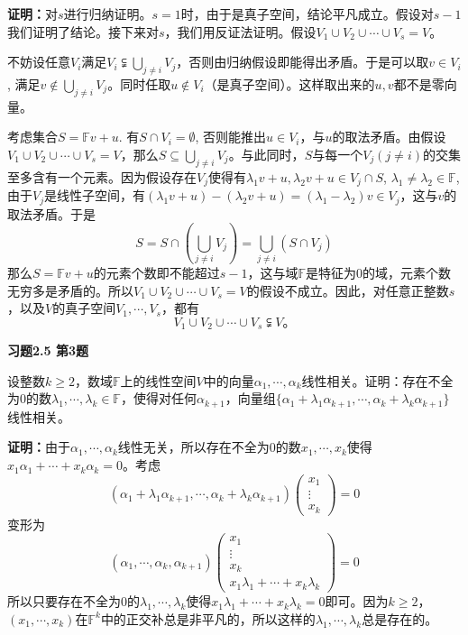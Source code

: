 {\bf 证明：}对$s$进行归纳证明。$s=1$时，由于是真子空间，结论平凡成立。假设对$s-1$我们证明了结论。接下来对$s$，我们用反证法证明。假设$V_1\cup V_2\cup \cdots \cup V_s = V$。

不妨设任意$V_i$满足$V_i \subsetneqq \bigcup\limits_{j\neq i} V_j$，否则由归纳假设即能得出矛盾。于是可以取$v\in V_i$, 满足$v\not\in \bigcup\limits_{j\neq i} V_j$。同时任取$u\not\in V_i$（是真子空间）。这样取出来的$u,v$都不是零向量。

考虑集合$S = \mathbb{F}v + u$. 有$S\cap V_i=\emptyset$, 否则能推出$u\in V_i$，与$u$的取法矛盾。由假设$V_1\cup V_2\cup \cdots \cup V_s = V$，那么$S\subseteq \bigcup\limits_{j\neq i} V_j$。与此同时，$S$与每一个$V_j (j\neq i)$的交集至多含有一个元素。因为假设存在$V_j$使得有$\lambda_1v+u, \lambda_2v+u \in V_j\cap S$, $\lambda_1\neq\lambda_2 \in \mathbb{F}$, 由于$V_j$是线性子空间，有$(\lambda_1v+u) - (\lambda_2v+u) = (\lambda_1 - \lambda_2)v \in V_j$，这与$v$的取法矛盾。于是
$$S = S\cap (\bigcup\limits_{j\neq i} V_j) = \bigcup\limits_{j\neq i} (S \cap V_j)$$
那么$S = \mathbb{F}v + u$的元素个数即不能超过$s-1$，这与域$\mathbb{F}$是特征为0的域，元素个数无穷多是矛盾的。所以$V_1\cup V_2\cup \cdots \cup V_s = V$的假设不成立。因此，对任意正整数$s$，以及$V$的真子空间$V_1,\cdots,V_s$，都有
$$V_1\cup V_2\cup \cdots \cup V_s \subsetneqq V。$$

\newpageorvspace

{\bf 习题2.5 第3题}

设整数$k\geqslant 2$，数域$\mathbb{F}$上的线性空间$V$中的向量$\alpha_1,\cdots, \alpha_k$线性相关。证明：存在不全为0的数$\lambda_1,\cdots,\lambda_k\in \mathbb{F}$，使得对任何$\alpha_{k+1}$，向量组$\{\alpha_1+\lambda_1\alpha_{k+1}, \cdots, \alpha_k+\lambda_k\alpha_{k+1}\}$线性相关。

{\bf 证明：}由于$\alpha_1,\cdots, \alpha_k$线性无关，所以存在不全为0的数$x_1,\cdots,x_k$使得$x_1\alpha_1+\cdots+x_k\alpha_k = 0$。考虑
$$(\alpha_1+\lambda_1\alpha_{k+1}, \cdots, \alpha_k+\lambda_k\alpha_{k+1}) \begin{pmatrix} x_1 \\ \vdots \\ x_k \end{pmatrix} = 0$$
变形为
$$(\alpha_1, \cdots, \alpha_k, \alpha_{k+1}) \begin{pmatrix} x_1 \\ \vdots \\ x_k \\ x_1\lambda_1+\cdots+x_k\lambda_k \end{pmatrix} = 0$$
所以只要存在不全为0的$\lambda_1,\cdots,\lambda_k$使得$x_1\lambda_1+\cdots+x_k\lambda_k=0$即可。因为$k\geqslant 2$，$(x_1,\cdots,x_k)$在$\mathbb{F}^k$中的正交补总是非平凡的，所以这样的$\lambda_1,\cdots,\lambda_k$总是存在的。

